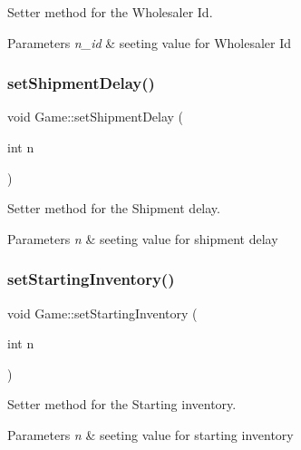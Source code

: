 Setter method for the Wholesaler Id. 


\begin{DoxyParams}{Parameters}
{\em n\+\_\+id} & seeting value for Wholesaler Id \\
\hline
\end{DoxyParams}
\mbox{\label{class_game_a1b45bb18641fd7b60c2b887899fe4464}} 
\subsubsection{\texorpdfstring{set\+Shipment\+Delay()}{setShipmentDelay()}}
{\footnotesize\ttfamily void Game\+::set\+Shipment\+Delay (\begin{DoxyParamCaption}\item[{int}]{n }\end{DoxyParamCaption})}



Setter method for the Shipment delay. 


\begin{DoxyParams}{Parameters}
{\em n} & seeting value for shipment delay \\
\hline
\end{DoxyParams}
\mbox{\label{class_game_aa994becb6fe955b2ed8dad3a24a57937}} 
\subsubsection{\texorpdfstring{set\+Starting\+Inventory()}{setStartingInventory()}}
{\footnotesize\ttfamily void Game\+::set\+Starting\+Inventory (\begin{DoxyParamCaption}\item[{int}]{n }\end{DoxyParamCaption})}



Setter method for the Starting inventory. 


\begin{DoxyParams}{Parameters}
{\em n} & seeting value for starting inventory \\
\hline
\end{DoxyParams}
\mbox{\label{class_game_abae5ec4f77327efde1516e8bd1edda2b}} 
